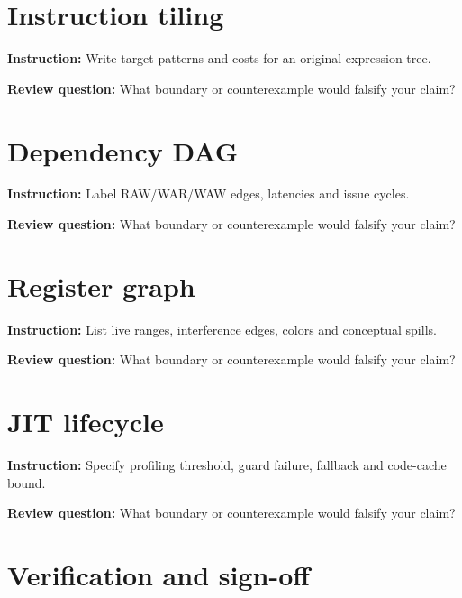 \documentclass[10pt,letterpaper]{article}
\begin{document}
\section{Instruction tiling}
\textbf{Instruction:} Write target patterns and costs for an original expression tree.\par{}
\textbf{Review question:} What boundary or counterexample would falsify your claim?\par\section{Dependency DAG}
\textbf{Instruction:} Label RAW/WAR/WAW edges, latencies and issue cycles.\par{}
\textbf{Review question:} What boundary or counterexample would falsify your claim?\par\section{Register graph}
\textbf{Instruction:} List live ranges, interference edges, colors and conceptual spills.\par{}
\textbf{Review question:} What boundary or counterexample would falsify your claim?\par\section{JIT lifecycle}
\textbf{Instruction:} Specify profiling threshold, guard failure, fallback and code-cache bound.\par{}
\textbf{Review question:} What boundary or counterexample would falsify your claim?\par\section{Verification and sign-off}
\end{document}
